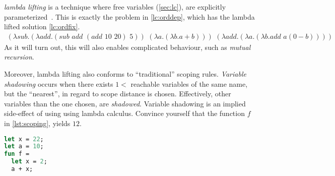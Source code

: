 \documentclass[11pt,oneside,a4paper]{report}
\begin{document}
\textit{lambda lifting} is a technique where free variables (\autoref{sec:lc}), are explicitly parameterized~\cite{johnsson1985lambda}.
This is exactly the problem in \autoref{lc:orddep}, which has the lambda lifted solution \autoref{lc:ordfix}.
\begin{align}
(\lambda sub . (\lambda add . (sub \,\, add \,\, (add \,\, 10 \,\, 20) \,\, 5)) \,\, (\lambda a . (\lambda b . a + b))) \,\, (\lambda add .(\lambda a . (\lambda b . add \,\, a (0 - b))))
\label{lc:ordfix}
\end{align}
As it will turn out, this will also enables complicated behaviour, such as \textit{mutual recursion}.

Moreover, lambda lifting also conforms to ``traditional'' scoping rules.
\textit{Variable shadowing} occurs when there exists $1 < $ reachable variables of the same name, but the ``nearest'', in regard to scope distance is chosen.
Effectively, other variables than the one chosen, are \textit{shadowed}.
Variable shadowing is an implied side-effect of using using lambda calculus.
Convince yourself that the function $f$ in \autoref{lst:scoping}, yields $12$.
\begin{lstlisting}[language=ML,caption={Scoping rules in programming languages},label={lst:scoping}]
let x = 22;
let a = 10;
fun f = 
  let x = 2;
  a + x;
\end{lstlisting}
\end{document}
